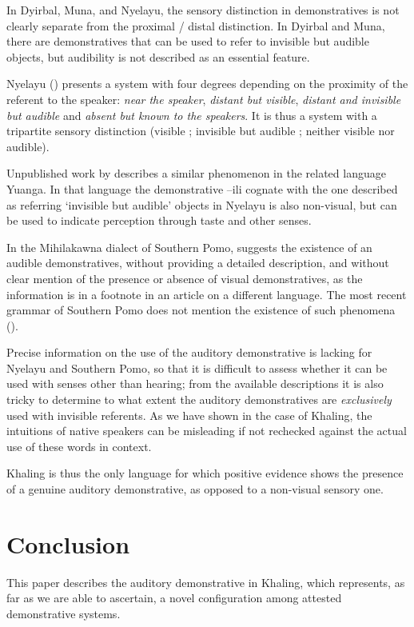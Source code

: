 \documentclass[oldfontcommands,oneside,a4paper,11pt]{article}
\newcommand{\ipa}[1]{{\phon \mbox{#1}}} %
\begin{document}
In Dyirbal, Muna, and Nyelayu,  the sensory distinction in demonstratives is not clearly separate from the proximal / distal distinction. In Dyirbal and Muna, there are demonstratives that can be used to refer to  invisible but audible objects, but audibility is not described as an essential feature. 

 Nyelayu (\citealt[98]{ozanne97spatial}) presents a system    with four degrees depending on the proximity of the referent to the speaker: \textit{near the speaker}, \textit{distant but visible}, \textit{distant and invisible but audible} and \textit{absent but known to the speakers}. It is thus a system with a tripartite sensory distinction (visible ; invisible but audible ; neither visible nor  audible). 

  Unpublished work by \citealt{bril-yuanga} describes a similar phenomenon in the related language Yuanga. In that language the demonstrative \ipa{--ili}  cognate with the one described as  referring `invisible but audible' objects in Nyelayu is also non-visual, but can be used to indicate perception through taste and other senses. 

In the Mihilakawna dialect of Southern Pomo,   \citet[37, ft]{oswalt86evidential} suggests the existence of an audible  demonstratives, without providing a detailed description, and without clear mention of the presence or absence of visual demonstratives, as the information is in a footnote in an article on a different language. The most recent grammar of Southern Pomo does not mention the existence of such phenomena (\citealt[232]{walker13pomo}).

Precise information on the  use of the auditory demonstrative is lacking for Nyelayu and Southern Pomo, so that it is difficult to assess whether it can be used with senses other than hearing; from the available descriptions it is also tricky to determine to what extent the auditory demonstratives are \textit{exclusively} used with  invisible referents. As we have shown in the case of Khaling, the intuitions of native speakers can be misleading if not rechecked against the actual use of these words in context.


Khaling is thus the only language for which positive evidence   shows the presence of a genuine auditory demonstrative, as opposed to a non-visual sensory one.  


\section{Conclusion}
This paper describes the auditory demonstrative in Khaling, which represents, as far as we are able to ascertain, a novel configuration among attested demonstrative systems.
\end{document}

